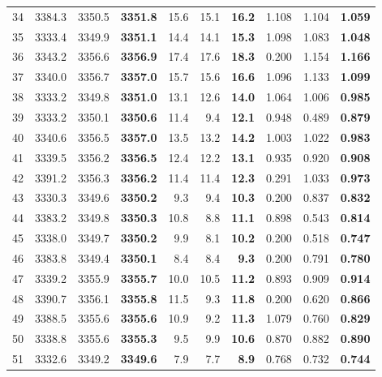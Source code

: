 \documentclass[a4paper,11pt]{article}
\begin{document}
\begin{longtable}{l rrr rrr rrr}
  34 & 3384.3 & 3350.5 & \textbf{3351.8} & 15.6 & 15.1 & \textbf{16.2} & 1.108 & 1.104 & \textbf{1.059} \\
  35 & 3333.4 & 3349.9 & \textbf{3351.1} & 14.4 & 14.1 & \textbf{15.3} & 1.098 & 1.083 & \textbf{1.048} \\
  36 & 3343.2 & 3356.6 & \textbf{3356.9} & 17.4 & 17.6 & \textbf{18.3} & 0.200 & 1.154 & \textbf{1.166} \\
  37 & 3340.0 & 3356.7 & \textbf{3357.0} & 15.7 & 15.6 & \textbf{16.6} & 1.096 & 1.133 & \textbf{1.099} \\
  38 & 3333.2 & 3349.8 & \textbf{3351.0} & 13.1 & 12.6 & \textbf{14.0} & 1.064 & 1.006 & \textbf{0.985} \\
  39 & 3333.2 & 3350.1 & \textbf{3350.6} & 11.4 & 9.4 & \textbf{12.1} & 0.948 & 0.489 & \textbf{0.879} \\
  40 & 3340.6 & 3356.5 & \textbf{3357.0} & 13.5 & 13.2 & \textbf{14.2} & 1.003 & 1.022 & \textbf{0.983} \\
  41 & 3339.5 & 3356.2 & \textbf{3356.5} & 12.4 & 12.2 & \textbf{13.1} & 0.935 & 0.920 & \textbf{0.908} \\
  42 & 3391.2 & 3356.3 & \textbf{3356.2} & 11.4 & 11.4 & \textbf{12.3} & 0.291 & 1.033 & \textbf{0.973} \\
  43 & 3330.3 & 3349.6 & \textbf{3350.2} & 9.3 & 9.4 & \textbf{10.3} & 0.200 & 0.837 & \textbf{0.832} \\
  44 & 3383.2 & 3349.8 & \textbf{3350.3} & 10.8 & 8.8 & \textbf{11.1} & 0.898 & 0.543 & \textbf{0.814} \\
  45 & 3338.0 & 3349.7 & \textbf{3350.2} & 9.9 & 8.1 & \textbf{10.2} & 0.200 & 0.518 & \textbf{0.747} \\
  46 & 3383.8 & 3349.4 & \textbf{3350.1} & 8.4 & 8.4 & \textbf{9.3} & 0.200 & 0.791 & \textbf{0.780} \\
  47 & 3339.2 & 3355.9 & \textbf{3355.7} & 10.0 & 10.5 & \textbf{11.2} & 0.893 & 0.909 & \textbf{0.914} \\
  48 & 3390.7 & 3356.1 & \textbf{3355.8} & 11.5 & 9.3 & \textbf{11.8} & 0.200 & 0.620 & \textbf{0.866} \\
  49 & 3388.5 & 3355.6 & \textbf{3355.6} & 10.9 & 9.2 & \textbf{11.3} & 1.079 & 0.760 & \textbf{0.829} \\
  50 & 3338.8 & 3355.6 & \textbf{3355.3} & 9.5 & 9.9 & \textbf{10.6} & 0.870 & 0.882 & \textbf{0.890} \\
  51 & 3332.6 & 3349.2 & \textbf{3349.6} & 7.9 & 7.7 & \textbf{8.9} & 0.768 & 0.732 & \textbf{0.744} \\

\end{longtable}
\end{document}
